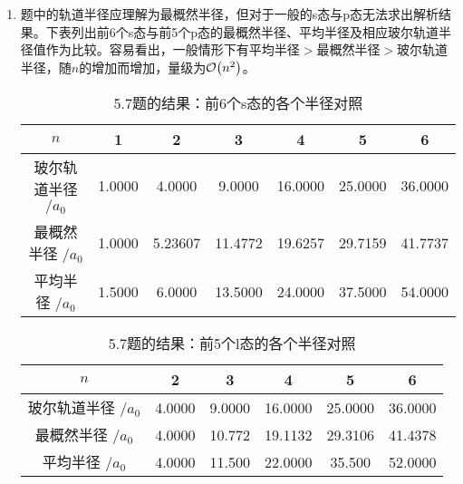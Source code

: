\begin{enumerate}[label=\textbf{5.\arabic*}, listparindent=\parindent, leftmargin=-0.5mm]
\item 题中的轨道半径应理解为最概然半径，但对于一般的s态与p态无法求出解析结果。下表列出前6个s态与前5个p态的最概然半径、平均半径及相应玻尔轨道半径值作为比较。容易看出，一般情形下有平均半径$>$最概然半径$>$玻尔轨道半径，随$n$的增加而增加，量级为$\order{n^2}$。
\begin{table}[H]
        \centering
        \begin{tabular}{c|c|c|c|c|c|c}
            \hline
            $n$ & 1 & 2 & 3 & 4 & 5 & 6 \\\hline
            玻尔轨道半径 $/a_0 $ & 1.0000 & 4.0000 & 9.0000 & 16.0000 & 25.0000 & 36.0000 \\
            最概然半径 $/a_0 $ &1.0000 &  5.23607 & 11.4772 &  19.6257 &  29.7159 & 41.7737 \\
            平均半径 $/a_0 $ & 1.5000 & 6.0000 & 13.5000 &  24.0000 & 37.5000 & 54.0000\\\hline
        \end{tabular}
        \caption{5.7题的结果：前6个s态的各个半径对照}
        \label{tab:my_label}
    \end{table}
\begin{table}[H]
        \centering
        \begin{tabular}{c|c|c|c|c|c}
            \hline
            $n$ &  2 & 3 & 4 & 5 & 6 \\\hline
            玻尔轨道半径 $/a_0 $ & 4.0000 & 9.0000 & 16.0000 & 25.0000 & 36.0000 \\
            最概然半径 $/a_0 $ & 4.0000 & 10.772 & 19.1132 & 29.3106 & 41.4378 \\
            平均半径 $/a_0 $ & 4.0000 &  11.500 &  22.0000 & 35.500 & 52.0000\\\hline
        \end{tabular}
        \caption{5.7题的结果：前5个l态的各个半径对照}
        \label{tab:my_label}
    \end{table}


\end{enumerate}
